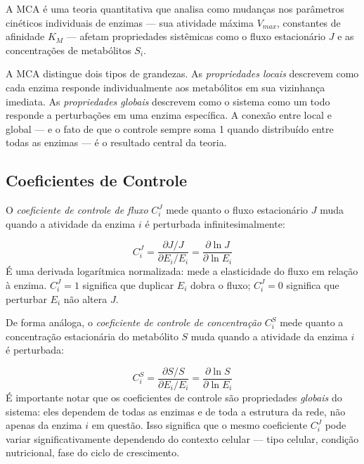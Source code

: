 \begin{definicaoenv}
A MCA é uma teoria quantitativa que analisa como mudanças nos parâmetros cinéticos
individuais de enzimas --- sua atividade máxima $V_{max}$, constantes de afinidade $K_M$
--- afetam propriedades sistêmicas como o fluxo estacionário $J$ e as concentrações de
metabólitos $S_i$.
\end{definicaoenv}

A MCA distingue dois tipos de grandezas. As \emph{propriedades locais} descrevem como cada
enzima responde individualmente aos metabólitos em sua vizinhança imediata. As \emph{propriedades
globais} descrevem como o sistema como um todo responde a perturbações em uma enzima
específica. A conexão entre local e global --- e o fato de que o controle sempre soma 1
quando distribuído entre todas as enzimas --- é o resultado central da teoria.

\subsection{Coeficientes de Controle}

O \emph{coeficiente de controle de fluxo} $C_i^J$ mede quanto o fluxo estacionário $J$
muda quando a atividade da enzima $i$ é perturbada infinitesimalmente:

\begin{equation}
C_i^J = \frac{\partial J / J}{\partial E_i / E_i} = \frac{\partial \ln J}{\partial \ln E_i}
\end{equation}
É uma derivada logarítmica normalizada: mede a elasticidade do fluxo em relação à enzima.
$C_i^J = 1$ significa que duplicar $E_i$ dobra o fluxo; $C_i^J = 0$ significa que
perturbar $E_i$ não altera $J$.

De forma análoga, o \emph{coeficiente de controle de concentração} $C_i^S$ mede quanto
a concentração estacionária do metabólito $S$ muda quando a atividade da enzima $i$ é
perturbada:

\begin{equation}
C_i^S = \frac{\partial S / S}{\partial E_i / E_i} = \frac{\partial \ln S}{\partial \ln E_i}
\end{equation}
É importante notar que os coeficientes de controle são propriedades \emph{globais} do
sistema: eles dependem de todas as enzimas e de toda a estrutura da rede, não apenas da
enzima $i$ em questão. Isso significa que o mesmo coeficiente $C_i^J$ pode variar
significativamente dependendo do contexto celular --- tipo celular, condição nutricional,
fase do ciclo de crescimento.


